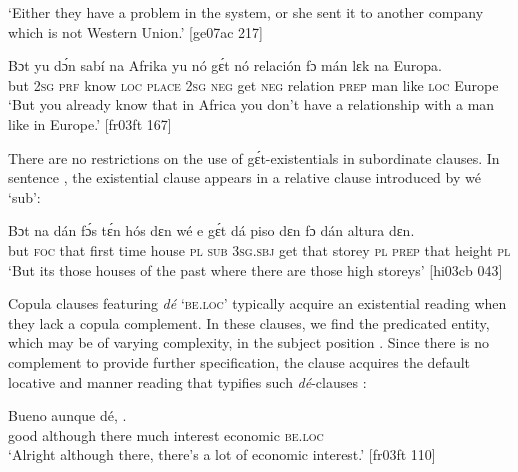 \glt ‘Either they have a problem in the system, or she sent it to another company 
which is not Western Union.’ [ge07ac 217]
\z


\ea%
    \label{ex:key:806}
    \gll Bɔt  yu  dɔ́n  sabí    na  Afrika  yu  nó  gɛ́t  nó
relación  fɔ  mán    lɛk  na  Europa.\\
but  \textsc{2sg}  \textsc{prf}  know  \textsc{loc}  \textsc{place}  \textsc{2sg}  \textsc{neg}  get \textsc{neg}
relation  \textsc{prep}  man    like  \textsc{loc}  Europe\\

\glt ‘But you already know that in Africa you don’t have a 
relationship with a man like in Europe.’ [fr03ft 167]
\z

There are no restrictions on the use of gɛ́t-existentials in subordinate clauses. In sentence , the existential clause appears in a relative clause introduced by wé ‘sub’: 


\ea%
    \label{ex:key:807}
    \gll Bɔt  na  dán  fɔ́s  tɛ́n  hós    dɛn  wé  e    gɛ́t
dá  piso    dɛn  fɔ  dán  altura  dɛn.\\
but  \textsc{foc}  that  first  time  house  \textsc{pl}  \textsc{sub}  \textsc{3sg.sbj}  get
that  storey  \textsc{pl}  \textsc{prep}  that  height  \textsc{pl}\\

\glt ‘But its those houses of the past where there are those high storeys’ [hi03cb 043]
\z

Copula clauses featuring \textit{dé} \textsc{‘be.loc’} typically acquire an existential reading when they lack a copula complement. In these clauses, we find the predicated entity, which may be of varying complexity, in the subject position . Since there is no complement to provide further specification, the clause acquires the default locative and manner reading that typifies such \textit{dé}{}-clauses :


\ea%
    \label{ex:key:808}
    \gll Bueno  aunque  dé,          .\\
good  although  there  much  interest  economic  \textsc{be.loc}\\

\glt ‘Alright although there, there’s a lot of economic interest.’ [fr03ft 110]
\z


